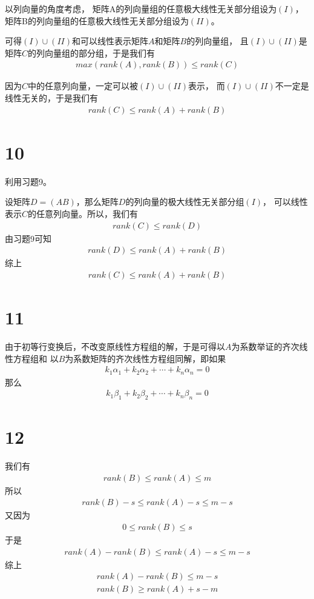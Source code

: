 \documentclass{article}
\begin{document}
以列向量的角度考虑，
矩阵A的列向量组的任意极大线性无关部分组设为$(I)$，
矩阵B的列向量组的任意极大线性无关部分组设为$(II)$。

可得$(I) \cup (II)$和可以线性表示矩阵$A$和矩阵$B$的列向量组，
且$(I) \cup (II)$是矩阵$C$的列向量组的部分组，于是我们有
\begin{align*}
  max(rank(A), rank(B)) \leq rank(C)
\end{align*}

因为$C$中的任意列向量，一定可以被$(I) \cup (II)$表示，
而$(I) \cup (II)$不一定是线性无关的，于是我们有
\begin{align*}
  rank(C) \leq rank(A) + rank(B)
\end{align*}

\section*{10}

利用习题9。

设矩阵$D = (AB)$，那么矩阵$D$的列向量的极大线性无关部分组$(I)$，
可以线性表示$C$的任意列向量。所以，我们有
\begin{align*}
  rank(C) \leq rank(D)
\end{align*}
由习题9可知
\begin{align*}
  rank(D) \leq rank(A) + rank(B)
\end{align*}
综上
\begin{align*}
  rank(C) \leq rank(A) + rank(B)
\end{align*}

\section*{11}

由于初等行变换后，不改变原线性方程组的解，于是可得以$A$为系数举证的齐次线性方程组和
以$B$为系数矩阵的齐次线性方程组同解，即如果
\begin{align}
  k_1 \alpha_1 + k_2 \alpha_2 + \cdots + k_n \alpha_n = 0
\end{align}
那么
\begin{align*}
  k_1 \beta_1 + k_2 \beta_2 + \cdots + k_n \beta_n = 0
\end{align*}

\section*{12}

我们有
\begin{align*}
  rank(B) \leq rank(A) \leq m
\end{align*}
所以
\begin{align*}
  rank(B) - s \leq rank(A) - s \leq m - s
\end{align*}
又因为
\begin{align*}
  0 \leq rank(B) \leq s
\end{align*}
于是
\begin{align*}
  rank(A) - rank(B) \leq rank(A) - s \leq m - s
\end{align*}
综上
\begin{align*}
  rank(A) - rank(B) \leq m - s \\
  rank(B) \geq rank(A) + s - m
\end{align*}
\end{document}
